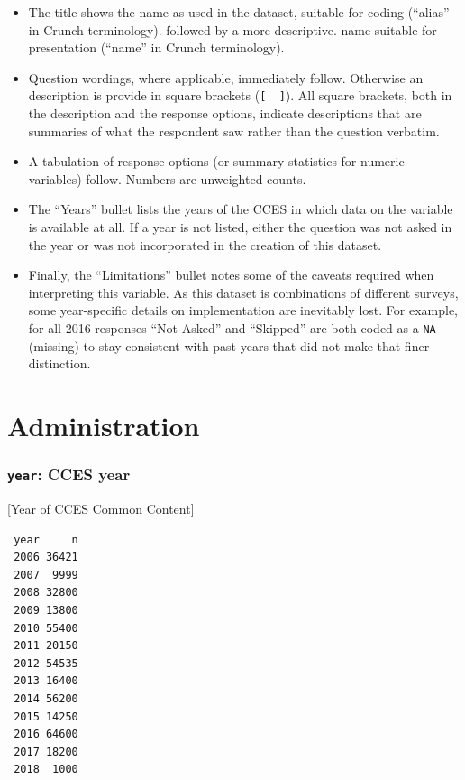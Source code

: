 \documentclass[10pt,article,oneside]{memoir}
\theoremstyle{definition}
\begin{document}
\begin{itemize}
\tightlist
\item
  The title shows the name as used in the dataset, suitable for coding
  (``alias'' in Crunch terminology). followed by a more descriptive.
  name suitable for presentation (``name'' in Crunch terminology).
\item
  Question wordings, where applicable, immediately follow. Otherwise an
  description is provide in square brackets (\texttt{{[}\ \ {]}}). All
  square brackets, both in the description and the response options,
  indicate descriptions that are summaries of what the respondent saw
  rather than the question verbatim.
\item
  A tabulation of response options (or summary statistics for numeric
  variables) follow. Numbers are unweighted counts.
\item
  The ``Years'' bullet lists the years of the CCES in which data on the
  variable is available at all. If a year is not listed, either the
  question was not asked in the year or was not incorporated in the
  creation of this dataset.
\item
  Finally, the ``Limitations'' bullet notes some of the caveats required
  when interpreting this variable. As this dataset is combinations of
  different surveys, some year-specific details on implementation are
  inevitably lost. For example, for all 2016 responses ``Not Asked'' and
  ``Skipped'' are both coded as a \texttt{NA} (missing) to stay
  consistent with past years that did not make that finer distinction.
\end{itemize}

\hypertarget{administration}{%
\section{Administration}\label{administration}}

\hypertarget{year-cces-year}{%
\subsubsection{\texorpdfstring{\texttt{year}: CCES
year}{year: CCES year}}\label{year-cces-year}}

{[}Year of CCES Common Content{]}

\begin{verbatim}
 year     n
 2006 36421
 2007  9999
 2008 32800
 2009 13800
 2010 55400
 2011 20150
 2012 54535
 2013 16400
 2014 56200
 2015 14250
 2016 64600
 2017 18200
 2018  1000
\end{verbatim}
\end{document}
